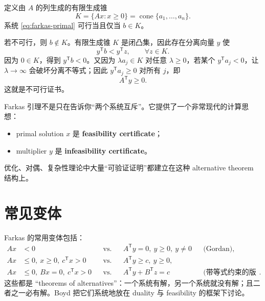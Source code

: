 \documentclass[11pt,a4paper,openany]{ctexrep}
\theoremstyle{definition}
\newcommand{\cone}{\operatorname{cone}}
\newcommand{\transpose}{\mathsf{T}}
\begin{document}
定义由 $A$ 的列生成的有限生成锥
\[
K=\{Ax:x\ge0\}=\cone\{a_1,\dots,a_n\}.
\]
系统 \eqref{eq:farkas-primal} 可行当且仅当 $b\in K$。

若不可行，则 $b\notin K$。有限生成锥 $K$ 是闭凸集，因此存在分离向量 $y$ 使
\[
y^\transpose b<y^\transpose z,
\qquad\forall z\in K.
\]
因为 $0\in K$，得到 $y^\transpose b<0$。又因为 $\lambda a_j\in K$ 对任意 $\lambda\ge0$，若某个 $y^\transpose a_j<0$，让 $\lambda\to\infty$ 会破坏分离不等式；因此 $y^\transpose a_j\ge0$ 对所有 $j$，即
\[
A^\transpose y\ge0.
\]
这就是不可行证书。\cite[\S4.6--4.7]{bertsimas}\cite[\S2.6]{luenberger}

\begin{intuitionbox}
Farkas 引理不是只在告诉你“两个系统互斥”。它提供了一个非常现代的计算思想：
\begin{itemize}
  \item primal solution $x$ 是 \textbf{feasibility certificate}；
  \item multiplier $y$ 是 \textbf{infeasibility certificate}。
\end{itemize}
优化、对偶、复杂性理论中大量“可验证证明”都建立在这种 alternative theorem 结构上。
\end{intuitionbox}

\section{常见变体}
Farkas 的常用变体包括：
\begin{align*}
Ax&<0
&&\text{vs.}&& A^\transpose y=0,\ y\ge0,\ y\ne0
&&\text{(Gordan)},\\
Ax&\le0,\ x\ge0,\ c^\transpose x>0
&&\text{vs.}&& A^\transpose y\ge c,\ y\ge0,\\
Ax&\le0,\ Bx=0,\ c^\transpose x>0
&&\text{vs.}&& A^\transpose y+B^\transpose z=c
&&\text{(带等式约束的版本)}.
\end{align*}
这些都是 ``theorems of alternatives''：一个系统有解，另一个系统就没有解；且二者之一必有解。Boyd 把它们系统地放在 duality 与 feasibility 的框架下讨论。\cite[\S5.8]{boyd}
\end{document}
